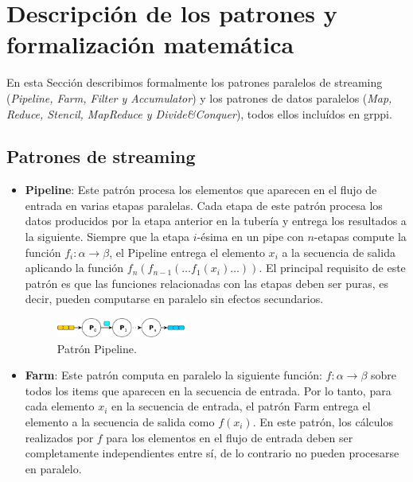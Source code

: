 \section{Descripción de los patrones y formalización matemática}
\label{sec:descripcion_patrones}

En esta Sección describimos formalmente los patrones paralelos de streaming (\emph{Pipeline, Farm, Filter y Accumulator}) y los patrones de datos paralelos (\emph{Map, Reduce, Stencil, MapReduce y Divide\&Conquer}), todos ellos incluídos en \acrshort{grppi}.

\subsection{Patrones de streaming}

\begin{itemize}
    \item \textbf{Pipeline}: Este patrón procesa los elementos que aparecen en el flujo de entrada en varias etapas paralelas. Cada etapa de este patrón procesa los datos producidos por la etapa anterior en la tubería y entrega los resultados a la siguiente. Siempre que la etapa $i$-ésima en un pipe con  $n$-etapas compute la función $f_i:\alpha \to \beta$, el Pipeline entrega el elemento $x_i$ a la secuencia de salida aplicando la función $f_n(f_{n-1}(\ldots f_1(x_i) \ldots ))$. El principal requisito de este patrón es que las funciones relacionadas con las etapas deben ser puras, es decir, pueden computarse en paralelo sin efectos secundarios.
    

\vspace{0.35cm}    
    \begin{figure}[htb]
    \centering
    \includegraphics[width=0.40\textwidth]{figures/pipeline.pdf}
    \caption{Patrón Pipeline.}
    \label{fig:chap3:Pipeline}
    \end{figure}
\vspace{0.35cm}
    
    \item \textbf{Farm}: Este patrón computa en paralelo la siguiente función: $f: \alpha \rightarrow \beta$ sobre todos los items que aparecen en la secuencia de entrada. Por lo tanto, para cada elemento $x_i$ en la secuencia de entrada, el patrón Farm entrega el elemento a la secuencia de salida como $f(x_i)$. En este patrón, los cálculos realizados por $f$ para los elementos en el flujo de entrada deben ser completamente independientes entre sí, de lo contrario no pueden procesarse en paralelo. 
    

\end{itemize}
